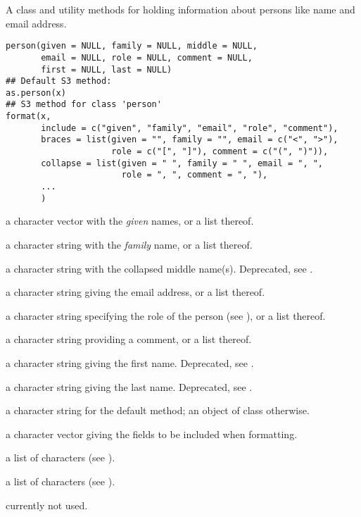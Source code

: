 \aliasA{[.person}{person}{[.person}
%
\begin{Description}\relax
A class and utility methods for holding information about persons
like name and email address.
\end{Description}
%
\begin{Usage}
\begin{verbatim}
person(given = NULL, family = NULL, middle = NULL,
       email = NULL, role = NULL, comment = NULL,
       first = NULL, last = NULL)
## Default S3 method:
as.person(x)
## S3 method for class 'person'
format(x,
       include = c("given", "family", "email", "role", "comment"),
       braces = list(given = "", family = "", email = c("<", ">"),
                     role = c("[", "]"), comment = c("(", ")")), 
       collapse = list(given = " ", family = " ", email = ", ",
                       role = ", ", comment = ", "),
       ...
       )
\end{verbatim}
\end{Usage}
%
\begin{Arguments}
\begin{ldescription}
\item[\code{given}] a character vector with the \emph{given} names,
or a list thereof.
\item[\code{family}] a character string with the \emph{family} name,
or a list thereof.
\item[\code{middle}] a character string with the collapsed middle name(s).
Deprecated, see .
\item[\code{email}] a character string giving the email address,
or a list thereof.
\item[\code{role}] a character string specifying the role of the person (see
),
or a list thereof.
\item[\code{comment}] a character string providing a comment,
or a list thereof.
\item[\code{first}] a character string giving the first name.
Deprecated, see .
\item[\code{last}] a character string giving the last name.
Deprecated, see .
\item[\code{x}] a character string for the  default method;
an object of class  otherwise.
\item[\code{include}] a character vector giving the fields to be included
when formatting.
\item[\code{braces}] a list of characters (see ).
\item[\code{collapse}] a list of characters (see ).
\item[\code{...}] currently not used. 
\end{ldescription}
\end{Arguments}
